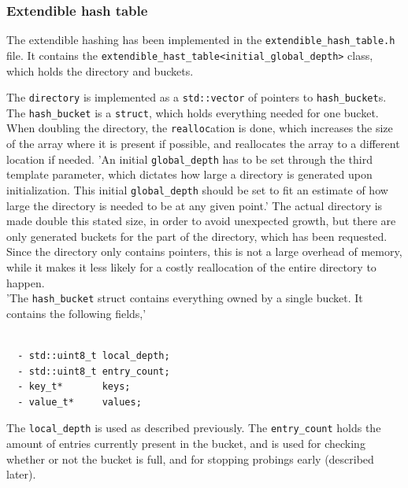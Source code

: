 \documentclass[11pt]{article} %
\begin{document}
\subsubsection{Extendible hash table}
The extendible hashing has been implemented in the \verb|extendible_hash_table.h| file. It contains the \verb|extendible_hast_table<initial_global_depth>| class, which holds the directory and buckets.

The \verb|directory| is implemented as a \verb|std::vector| of pointers to \verb|hash_bucket|s. The \verb|hash_bucket| is a \verb|struct|, which holds everything needed for one bucket. When doubling the directory, the \verb|realloc|ation is done, which increases the size of the array where it is present if possible, and reallocates the array to a different location if needed. 'An initial \verb|global_depth| has to be set through the third template parameter, which dictates how large a directory is generated upon initialization. This initial \verb|global_depth| should be set to fit an estimate of how large the directory is needed to be at any given point.' The actual directory is made double this stated size, in order to avoid unexpected growth, but there are only generated buckets for the part of the directory, which has been requested. Since the directory only contains pointers, this is not a large overhead of memory, while it makes it less likely for a costly reallocation of the entire directory to happen. \\

'The \verb|hash_bucket| struct contains everything owned by a single bucket. It contains the following fields,'

\begin{lstlisting}[frame=single]  % Start your code-block

  - std::uint8_t local_depth;
  - std::uint8_t entry_count;
  - key_t*       keys;
  - value_t*     values;
\end{lstlisting}
The \verb|local_depth| is used as described previously. The \verb|entry_count| holds the amount of entries currently present in the bucket, and is used for checking whether or not the bucket is full, and for stopping probings early (described later). 
\end{document}
